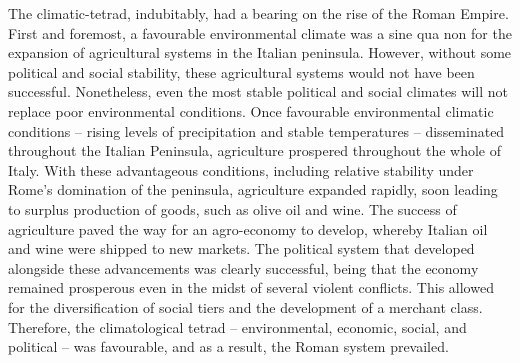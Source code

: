The climatic-tetrad, indubitably, had a bearing on the rise of the Roman Empire. First and foremost, a favourable environmental climate was a sine qua non for the expansion of agricultural systems in the Italian peninsula. However, without some political and social stability, these agricultural systems would not have been successful. Nonetheless, even the most stable political and social climates will not replace poor environmental conditions. Once favourable environmental climatic conditions – rising levels of precipitation and stable temperatures – disseminated throughout the Italian Peninsula, agriculture prospered throughout the whole of Italy. With these advantageous conditions, including relative stability under Rome’s domination of the peninsula, agriculture expanded rapidly, soon leading to surplus production of goods, such as olive oil and wine. The success of agriculture paved the way for an agro-economy to develop, whereby Italian oil and wine were shipped to new markets. The political system that developed alongside these advancements was clearly successful, being that the economy remained prosperous even in the midst of several violent conflicts. This allowed for the diversification of social tiers and the development of a merchant class. Therefore, the climatological tetrad – environmental, economic, social, and political – was favourable, and as a result, the Roman system prevailed. 


